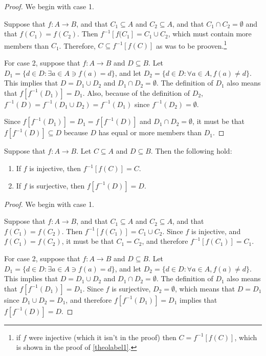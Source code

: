 \begin{proof}
	We begin with case 1.
	
	Suppose that $f:A\rightarrow B$, and that $C_1\subseteq A$ and $C_2\subseteq A$, and that $C_1 \cap C_2 = \emptyset$ and that $f(C_1)=f(C_2)$. Then $f^{-1}[f(C_1]=C_1 \cup C_2$, which must contain more members than $C_1$. Therefore, $C\subseteq f^{-1}[f(C)]$ as was to be prooven.\footnote{if $f$ were injective (which it isn't in the proof) then $C = f^{-1}[f(C)]$, which is shown in the proof of \ref{theolabel1}.} \bigskip
	
	For case 2, suppose that $f:A\rightarrow B$ and $D\subseteq B$. Let $D_1 = \{d\in D: \exists a\in A \ni f(a)=d\}$, and let $D_2 = \{d\in D: \forall a\in A,f(a)\neq d\}$. This implies that $D = D_1 \cup D_2$ and $D_1 \cap D_2 = \emptyset$. The definition of $D_1$ also means that $f[f^{-1}(D_1)] = D_1$. Also, because of the definition of $D_2$, $f^{-1}(D)=f^{-1}(D_1\cup D_2)=f^{-1}(D_1)$ since $f^{-1}(D_2)=\emptyset$.
	
	Since $f[f^{-1}(D_1)] = D_1 = f[f^{-1}(D)]$ and $D_1 \cap D_2 = \emptyset$, it must be that $f[f^{-1}(D)]\subseteq D$ because $D$ has equal or more members than $D_1$.
\end{proof}

\begin{theorem}
	\label{theolabel1}
	Suppose that $f:A\rightarrow B$. Let $C\subseteq A$ and $D\subseteq B$. Then the following hold:
	\begin{enumerate}
		\item If $f$ is injective, then $f^{-1}[f(C)]=C$.
		\item If $f$ is surjective, then $f[f^{-1}(D)]=D$.
	\end{enumerate}
\end{theorem}

\begin{proof}
	We begin with case 1.
	
 	Suppose that $f:A\rightarrow B$, and that $C_1\subseteq A$ and $C_2\subseteq A$, and that $f(C_1)=f(C_2)$. Then $f^{-1}[f(C_1)]=C_1\cup C_2$. Since $f$ is injective, and $f(C_1)=f(C_2)$, it must be that $C_1 = C_2$, and therefore $f^{-1}[f(C_1)]=C_1$.\bigskip
 	
 	For case 2, suppose that $f:A\rightarrow B$ and $D\subseteq B$. Let $D_1 = \{d\in D: \exists a\in A \ni f(a)=d\}$, and let $D_2 = \{d\in D: \forall a\in A,f(a)\neq d\}$. This implies that $D = D_1 \cup D_2$ and $D_1 \cap D_2 = \emptyset$. The definition of $D_1$ also means that $f[f^{-1}(D_1)] = D_1$. Since $f$ is surjective, $D_2=\emptyset$, which means that $D = D_1$ since $D_1 \cup D_2 = D_1$, and therefore $f[f^{-1}(D_1)] = D_1$ implies that $f[f^{-1}(D)] = D$.
\end{proof}

